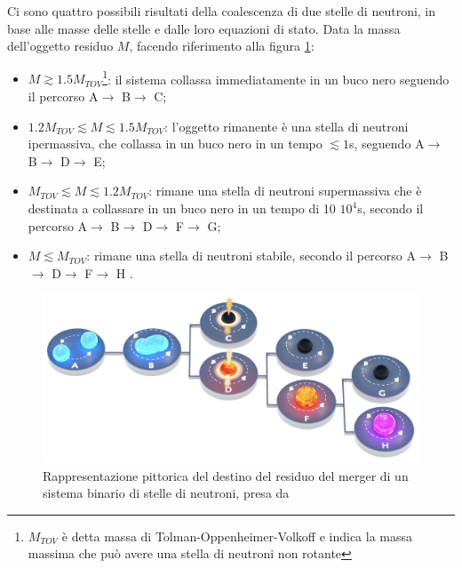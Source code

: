 Ci sono quattro possibili risultati della coalescenza di due stelle di neutroni, in base alle masse delle stelle e dalle loro equazioni di stato. 
Data la massa dell'oggetto residuo $M$, facendo riferimento alla figura \ref{fig:EvoluzioneBNS}:
\begin{itemize}
	\item $M\gtrsim 1.5 M_{TOV}$\footnote{$M_{TOV}$ è detta massa di Tolman-Oppenheimer-Volkoff e indica la massa massima che può avere una stella di neutroni non rotante}: il sistema collassa immediatamente in un buco nero seguendo il percorso A$\rightarrow$ B$\rightarrow$ C;
	\item $1.2 M_{TOV} \lesssim M \lesssim 1.5 M_{TOV}$: l'oggetto rimanente è una stella di neutroni ipermassiva, che collassa in un buco nero in un tempo $\lesssim 1$s, seguendo A$\rightarrow$ B$\rightarrow$ D$\rightarrow$ E;		
	\item $M_{TOV} \lesssim M \lesssim 1.2 M_{TOV}$: rimane una stella di neutroni supermassiva che è destinata a collassare in un buco nero in un tempo di 10 \textdiv $10^4$s, secondo il percorso A$\rightarrow$ B$\rightarrow$ D$\rightarrow$ F$\rightarrow$ G;		\item $M\lesssim M_{TOV}$: rimane una stella di neutroni stabile, secondo il percorso A$\rightarrow$ B$\rightarrow$ D$\rightarrow$ F$\rightarrow$ H \cite{sarin2020evolution}.	
\end{itemize}
\begin{center}
	\begin{figure}[ht]
		\centering
		\includegraphics[scale=0.25, angle=0]{figures/Capitolo_1/MagnetarEvolution.png}
		\setlength{\belowcaptionskip}{-20pt}
		\caption{Rappresentazione pittorica del destino del residuo del merger di un sistema binario di stelle di neutroni, presa da \cite{sarin2020evolution}}
		\label{fig:EvoluzioneBNS}
	\end{figure}
\end{center}

